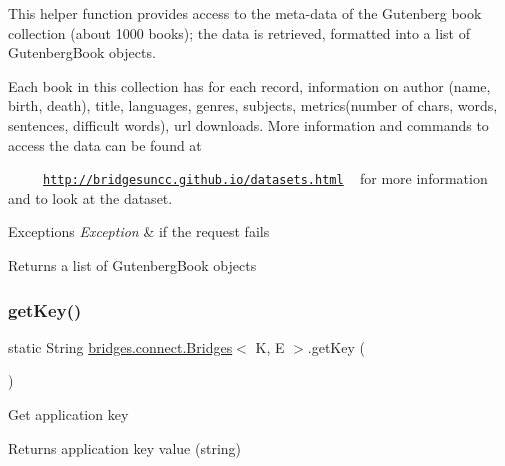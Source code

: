 This helper function provides access to the meta-\/data of the Gutenberg book collection (about 1000 books); the data is retrieved, formatted into a list of Gutenberg\+Book objects.

Each book in this collection has for each record, information on author (name, birth, death), title, languages, genres, subjects, metrics(number of chars, words, sentences, difficult words), url downloads. More information and commands to access the data can be found at 

~~~~~\href{http://bridgesuncc.github.io/datasets.html}{\tt http\+://bridgesuncc.\+github.\+io/datasets.\+html} ~\newline
 for more information and to look at the dataset.


\begin{DoxyExceptions}{Exceptions}
{\em Exception} & if the request fails\\
\hline
\end{DoxyExceptions}
\begin{DoxyReturn}{Returns}
a list of Gutenberg\+Book objects 
\end{DoxyReturn}
\hypertarget{classbridges_1_1connect_1_1_bridges_a813a1783f7b547fdb964f8af87c66f4b}{}\label{classbridges_1_1connect_1_1_bridges_a813a1783f7b547fdb964f8af87c66f4b} 
\subsubsection{\texorpdfstring{get\+Key()}{getKey()}}
{\footnotesize\ttfamily static String \hyperlink{classbridges_1_1connect_1_1_bridges}{bridges.\+connect.\+Bridges}$<$ K, E $>$.get\+Key (\begin{DoxyParamCaption}{ }\end{DoxyParamCaption})\hspace{0.3cm}{\ttfamily [static]}}

Get application key

\begin{DoxyReturn}{Returns}
application key value (string) 
\end{DoxyReturn}
\hypertarget{classbridges_1_1connect_1_1_bridges_ad46be93cba155fa93fd9082d9d813466}{}\label{classbridges_1_1connect_1_1_bridges_ad46be93cba155fa93fd9082d9d813466} 

